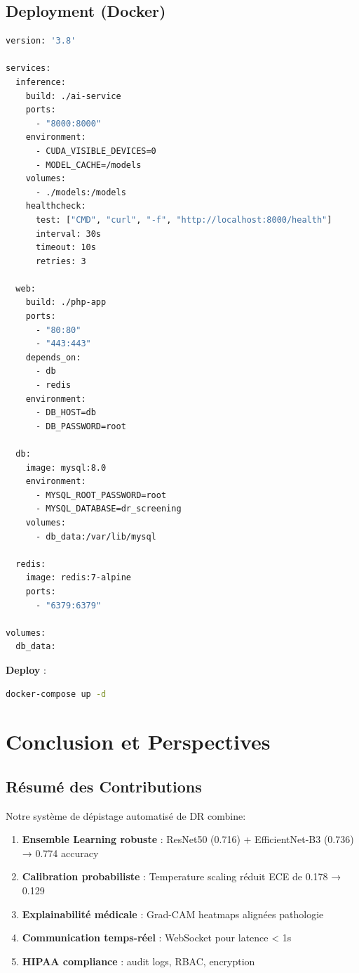 \documentclass[12pt,a4paper,oneside]{report}
\begin{document}
\section{Deployment (Docker)}

\begin{lstlisting}[language=bash, caption=docker-compose.yml]
version: '3.8'

services:
  inference:
    build: ./ai-service
    ports:
      - "8000:8000"
    environment:
      - CUDA_VISIBLE_DEVICES=0
      - MODEL_CACHE=/models
    volumes:
      - ./models:/models
    healthcheck:
      test: ["CMD", "curl", "-f", "http://localhost:8000/health"]
      interval: 30s
      timeout: 10s
      retries: 3
  
  web:
    build: ./php-app
    ports:
      - "80:80"
      - "443:443"
    depends_on:
      - db
      - redis
    environment:
      - DB_HOST=db
      - DB_PASSWORD=root
  
  db:
    image: mysql:8.0
    environment:
      - MYSQL_ROOT_PASSWORD=root
      - MYSQL_DATABASE=dr_screening
    volumes:
      - db_data:/var/lib/mysql
  
  redis:
    image: redis:7-alpine
    ports:
      - "6379:6379"

volumes:
  db_data:
\end{lstlisting}

\textbf{Deploy} :
\begin{lstlisting}[language=bash]
docker-compose up -d
\end{lstlisting}

\newpage


\chapter{Conclusion et Perspectives}

\section{Résumé des Contributions}

Notre système de dépistage automatisé de DR combine:

\begin{enumerate}
    \item \textbf{Ensemble Learning robuste} : ResNet50 (0.716) + 
          EfficientNet-B3 (0.736) → 0.774 accuracy
    \item \textbf{Calibration probabiliste} : Temperature scaling 
          réduit ECE de 0.178 → 0.129
    \item \textbf{Explainabilité médicale} : Grad-CAM heatmaps 
          alignées pathologie
    \item \textbf{Communication temps-réel} : WebSocket pour latence 
          < 1s
    \item \textbf{HIPAA compliance} : audit logs, RBAC, encryption
\end{enumerate}
\end{document}
